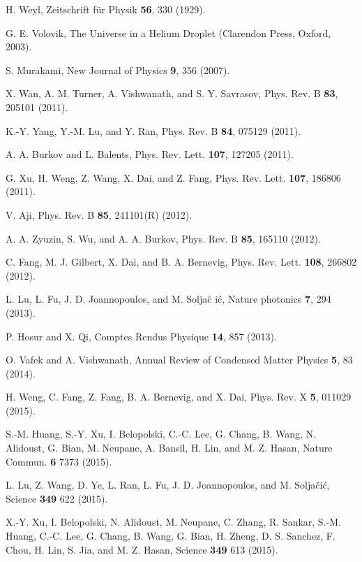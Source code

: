 \documentclass[prl,aps,twocolumn,showpacs,floatfix]{revtex4}
\begin{document}
\begin{thebibliography}{99}
 {H. Weyl, Zeitschrift f{\"u}r Physik \textbf{56}, 330 (1929).}

 {G. E. Volovik, The Universe in a Helium Droplet
(Clarendon Press, Oxford, 2003).}

 {S. Murakami, New Journal of Physics \textbf{9},
356 (2007). }

 {X. Wan, A. M. Turner, A. Vishwanath, and S. Y.
Savrasov, Phys. Rev. B \textbf{83}, 205101 (2011).}

 {K.-Y. Yang, Y.-M. Lu, and Y. Ran, Phys. Rev. B
\textbf{84}, 075129 (2011).}

 {A. A. Burkov and L. Balents, Phys. Rev. Lett.
\textbf{107}, 127205 (2011).}

 {G. Xu, H. Weng, Z. Wang, X. Dai, and Z. Fang,
Phys. Rev. Lett. \textbf{107}, 186806 (2011).}

 {V. Aji, Phys. Rev. B \textbf{85}, 241101(R) (2012).}

 {A. A. Zyuzin, S. Wu, and A. A. Burkov, Phys. Rev. B
\textbf{85}, 165110 (2012).}

 {C. Fang, M. J. Gilbert, X. Dai, and B. A.
Bernevig, Phys. Rev. Lett. \textbf{108}, 266802 (2012).}

 {L. Lu, L. Fu, J. D. Joannopoulos, and M. Solja\u{c}%
i\'c, Nature photonics \textbf{7}, 294 (2013).}

 {P. Hosur and X. Qi, Comptes Rendus Physique \textbf{%
14}, 857 (2013).}

 {O. Vafek and A. Vishwanath, Annual Review of Condensed
Matter Physics \textbf{5}, 83 (2014).}

 {H. Weng, C. Fang, Z. Fang, B. A. Bernevig, and X. Dai,
Phys. Rev. X \textbf{5}, 011029 (2015).} %

 {S.-M. Huang, S.-Y. Xu, I. Belopolski, C.-C. Lee, G.
Chang, B. Wang, N. Alidoust, G. Bian, M. Neupane, A. Bansil, H. Lin, and M.
Z. Hasan, Nature Commun. \textbf{6} 7373 (2015).} %

 {L. Lu, Z. Wang, D. Ye, L. Ran, L. Fu, J. D. Joannopoulos,
and M. Solja{\v{c}}i\'c, Science \textbf{349} 622 (2015).}

 {X.-Y. Xu, I. Belopolski, N. Alidoust, M. Neupane, C.
Zhang, R. Sankar, S.-M. Huang, C.-C. Lee, G. Chang, B. Wang, G. Bian, H.
Zheng, D. S. Sanchez, F. Chou, H. Lin, S. Jia, and M. Z. Hasan, Science
\textbf{349} 613 (2015).} %


\end{thebibliography}
\end{document}
